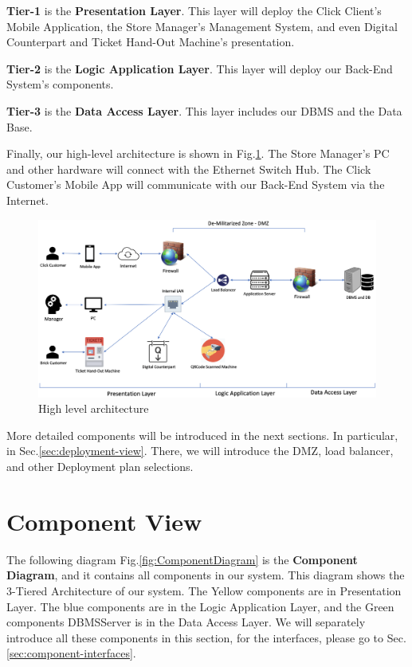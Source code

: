 \documentclass[a4paper,12pt]{report}
\begin{document}
\textbf{Tier-1} is the \textbf{Presentation Layer}.
This layer will deploy the Click Client's Mobile Application,
the Store Manager's Management System,
and even Digital Counterpart and Ticket Hand-Out Machine's presentation.

\textbf{Tier-2} is the \textbf{Logic Application Layer}.
This layer will deploy our Back-End System's components.

\textbf{Tier-3} is the \textbf{Data Access Layer}.
This layer includes our DBMS and the Data Base.

Finally, our high-level architecture is shown in Fig.\ref{fig:HighLevelArchitecture}.
The Store Manager's PC and other hardware will connect with the Ethernet Switch Hub.
The Click Customer's Mobile App will communicate with our Back-End System via the Internet.

\begin{figure}[H]
	\centering
	\includegraphics[width=1.2\textwidth]{HighLevelArchitecture}
	\caption{High level architecture}
	\centering
	\label{fig:HighLevelArchitecture}
\end{figure}

More detailed components will be introduced in the next sections.
In particular, in Sec.\ref{sec:deployment-view}.
There, we will introduce the DMZ, load balancer, and other Deployment plan selections.


\section{Component View} \label{sec:ComponentView}
The following diagram Fig.\ref{fig:ComponentDiagram} is the \textbf{Component Diagram}, and it contains all components in our system.
This diagram shows the 3-Tiered Architecture of our system.
The Yellow components are in Presentation Layer.
The blue components are in the Logic Application Layer, and the Green components DBMSServer is in the Data Access Layer.
We will separately introduce all these components in this section, for the interfaces, please go to Sec.\ref{sec:component-interfaces}.
\end{document}
